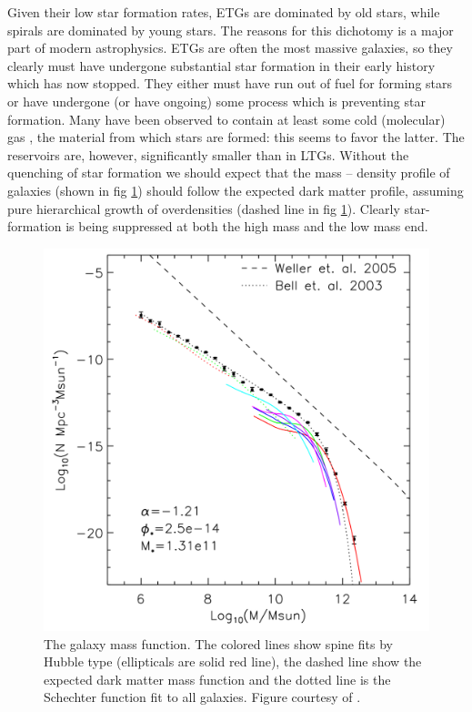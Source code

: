 Given their low star formation rates, ETGs are dominated by old stars, while spirals are dominated by young stars. The reasons for this dichotomy is a major part of modern astrophysics. ETGs are often the most massive galaxies, so they clearly must have undergone substantial star formation in their early history which has now stopped. They either must have run out of fuel for forming stars or have undergone (or have ongoing) some process which is preventing star formation. Many have been observed to contain at least some cold (molecular) gas \citep{Lees1991}, the material from which stars are formed: this seems to favor the latter. The reservoirs are, however, significantly smaller than in LTGs. Without the quenching of star formation we should expect that the mass -- density profile of galaxies (shown in fig \ref{fig:massSuppression}) should follow the expected dark matter profile, assuming pure hierarchical growth of overdensities (dashed line in fig \ref{fig:massSuppression}). Clearly star-formation is being suppressed at both the high mass and the low mass end.

\begin{figure}
	\centering
	\includegraphics[width=\textwidth]{introduction/agnFeedback.png}
	\caption[Galaxy mass function]{The galaxy mass function. The colored lines show spine fits by Hubble type (ellipticals are solid red line), the dashed line show the expected dark matter mass function \citep{Weller2005} and the dotted line is the Schechter function fit to all galaxies. Figure courtesy of \citet{Read2005}.}
	\label{fig:massSuppression}
\end{figure}


